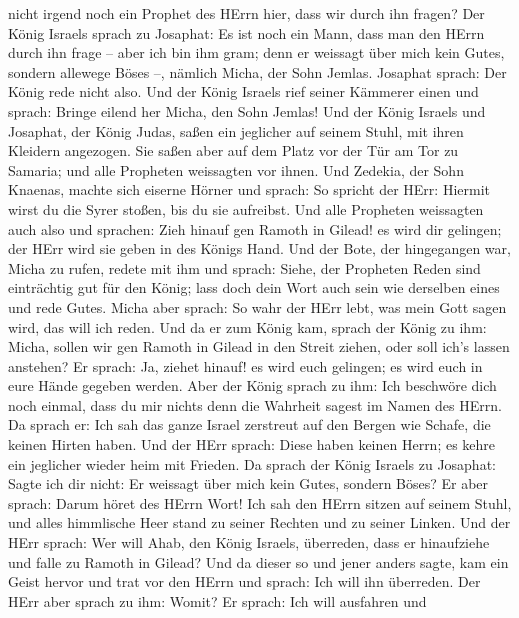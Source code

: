 nicht irgend noch ein Prophet des HErrn hier, dass wir durch ihn fragen?
 Der König Israels sprach zu Josaphat: Es ist noch ein Mann,
dass man den HErrn durch ihn frage -- aber ich bin ihm gram; denn er
weissagt über mich kein Gutes, sondern allewege Böses --, nämlich Micha,
der Sohn Jemlas. Josaphat sprach: Der König rede nicht also.
 Und der König Israels rief seiner Kämmerer einen und
sprach: Bringe eilend her Micha, den Sohn Jemlas!  Und der
König Israels und Josaphat, der König Judas, saßen ein jeglicher auf
seinem Stuhl, mit ihren Kleidern angezogen. Sie saßen aber auf dem Platz
vor der Tür am Tor zu Samaria; und alle Propheten weissagten vor ihnen.
 Und Zedekia, der Sohn Knaenas, machte sich eiserne Hörner
und sprach: So spricht der HErr: Hiermit wirst du die Syrer stoßen, bis
du sie aufreibst.  Und alle Propheten weissagten auch also
und sprachen: Zieh hinauf gen Ramoth in Gilead! es wird dir gelingen;
der HErr wird sie geben in des Königs Hand.  Und der Bote,
der hingegangen war, Micha zu rufen, redete mit ihm und sprach: Siehe,
der Propheten Reden sind einträchtig gut für den König; lass doch dein
Wort auch sein wie derselben eines und rede Gutes.  Micha
aber sprach: So wahr der HErr lebt, was mein Gott sagen wird, das will
ich reden.  Und da er zum König kam, sprach der König zu
ihm: Micha, sollen wir gen Ramoth in Gilead in den Streit ziehen, oder
soll ich's lassen anstehen? Er sprach: Ja, ziehet hinauf! es wird euch
gelingen; es wird euch in eure Hände gegeben werden.  Aber
der König sprach zu ihm: Ich beschwöre dich noch einmal, dass du mir
nichts denn die Wahrheit sagest im Namen des HErrn.  Da
sprach er: Ich sah das ganze Israel zerstreut auf den Bergen wie Schafe,
die keinen Hirten haben. Und der HErr sprach: Diese haben keinen Herrn;
es kehre ein jeglicher wieder heim mit Frieden.  Da sprach
der König Israels zu Josaphat: Sagte ich dir nicht: Er weissagt über
mich kein Gutes, sondern Böses?  Er aber sprach: Darum
höret des HErrn Wort! Ich sah den HErrn sitzen auf seinem Stuhl, und
alles himmlische Heer stand zu seiner Rechten und zu seiner Linken.
 Und der HErr sprach: Wer will Ahab, den König Israels,
überreden, dass er hinaufziehe und falle zu Ramoth in Gilead? Und da
dieser so und jener anders sagte,  kam ein Geist hervor und
trat vor den HErrn und sprach: Ich will ihn überreden. Der HErr aber
sprach zu ihm: Womit?  Er sprach: Ich will ausfahren und
